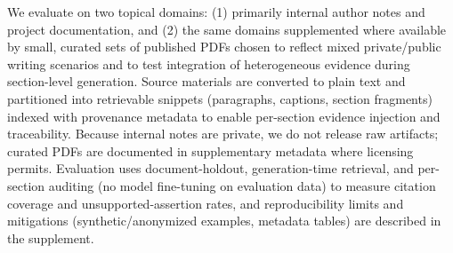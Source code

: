We evaluate on two topical domains: (1) primarily internal author notes and project documentation, and (2) the same domains supplemented where available by small, curated sets of published PDFs chosen to reflect mixed private/public writing scenarios and to test integration of heterogeneous evidence during section-level generation. Source materials are converted to plain text and partitioned into retrievable snippets (paragraphs, captions, section fragments) indexed with provenance metadata to enable per-section evidence injection and traceability. Because internal notes are private, we do not release raw artifacts; curated PDFs are documented in supplementary metadata where licensing permits. Evaluation uses document-holdout, generation-time retrieval, and per-section auditing (no model fine-tuning on evaluation data) to measure citation coverage and unsupported-assertion rates, and reproducibility limits and mitigations (synthetic/anonymized examples, metadata tables) are described in the supplement.